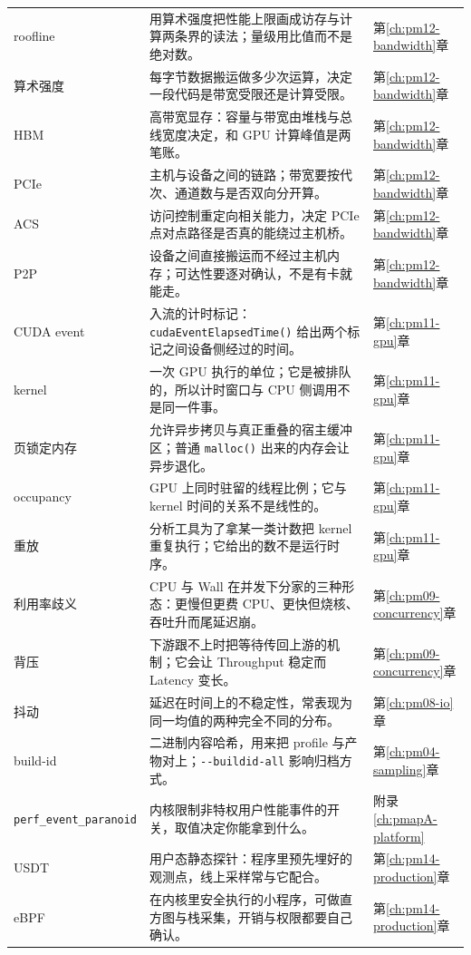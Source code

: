 \documentclass[12pt,a4paper,fontset=fandol]{ctexbook}
\newcommand{\Fn}[1]{\texttt{#1()}}
\newcommand{\Tp}[1]{\texttt{#1}}
\newcommand{\Opt}[1]{\texttt{-\/-#1}}
\newcommand{\Bk}{\discretionary{}{}{}}
\newcommand{\Lang}[1]{\textsf{#1}}
\newcommand{\MWall}{\Lang{Wall}}
\newcommand{\MCpu}{\Lang{CPU}}
\newcommand{\MLat}{\Lang{Latency}}
\newcommand{\MThr}{\Lang{Throughput}}
\newcommand{\Mx}[1]{\textsf{#1}}
\begin{document}
\begin{longtable}{>{\raggedright\arraybackslash}p{}
                  >{\raggedright\arraybackslash}p{}
                  >{\raggedright\arraybackslash}p{}}
roofline & 用算术强度把性能上限画成访存与计算两条界的读法；量级用比值而不是绝对数。 & 第\ref{ch:pm12-bandwidth}章 \\
算术强度 & 每字节数据搬运做多少次运算，决定一段代码是带宽受限还是计算受限。 & 第\ref{ch:pm12-bandwidth}章 \\
HBM & 高带宽显存：容量与带宽由堆栈与总线宽度决定，和 GPU 计算峰值是两笔账。 & 第\ref{ch:pm12-bandwidth}章 \\
PCIe & 主机与设备之间的链路；带宽要按代次、通道数与是否双向分开算。 & 第\ref{ch:pm12-bandwidth}章 \\
ACS & 访问控制重定向相关能力，决定 PCIe 点对点路径是否真的能绕过主机桥。 & 第\ref{ch:pm12-bandwidth}章 \\
P2P & 设备之间直接搬运而不经过主机内存；可达性要逐对确认，不是有卡就能走。 & 第\ref{ch:pm12-bandwidth}章 \\
CUDA event & 入流的计时标记：\Fn{cudaEventElapsedTime} 给出两个标记之间设备侧经过的时间。 & 第\ref{ch:pm11-gpu}章 \\
kernel & 一次 GPU 执行的单位；它是被排队的，所以计时窗口与 CPU 侧调用不是同一件事。 & 第\ref{ch:pm11-gpu}章 \\
页锁定内存 & 允许异步拷贝与真正重叠的宿主缓冲区；普通 \Fn{malloc} 出来的内存会让异步退化。 & 第\ref{ch:pm11-gpu}章 \\
\Mx{occupancy} & GPU 上同时驻留的线程比例；它与 kernel 时间的关系不是线性的。 & 第\ref{ch:pm11-gpu}章 \\
重放 & 分析工具为了拿某一类计数把 kernel 重复执行；它给出的数不是运行时序。 & 第\ref{ch:pm11-gpu}章 \\
利用率歧义 & \MCpu{} 与 \MWall{} 在并发下分家的三种形态：更慢但更费 CPU、更快但烧核、吞吐升而尾延迟崩。 & 第\ref{ch:pm09-concurrency}章 \\
背压 & 下游跟不上时把等待传回上游的机制；它会让 \MThr{} 稳定而 \MLat{} 变长。 & 第\ref{ch:pm09-concurrency}章 \\
抖动 & 延迟在时间上的不稳定性，常表现为同一均值的两种完全不同的分布。 & 第\ref{ch:pm08-io}章 \\
\Mx{build-id} & 二进制内容哈希，用来把 profile 与产物对上；\Opt{buildid-all} 影响归档方式。 & 第\ref{ch:pm04-sampling}章 \\
\Tp{perf\_event\_{\Bk}paranoid} & 内核限制非特权用户性能事件的开关，取值决定你能拿到什么。 & 附录\ref{ch:pmapA-platform} \\
USDT & 用户态静态探针：程序里预先埋好的观测点，线上采样常与它配合。 & 第\ref{ch:pm14-production}章 \\
eBPF & 在内核里安全执行的小程序，可做直方图与栈采集，开销与权限都要自己确认。 & 第\ref{ch:pm14-production}章 \\

\end{longtable}
\end{document}
